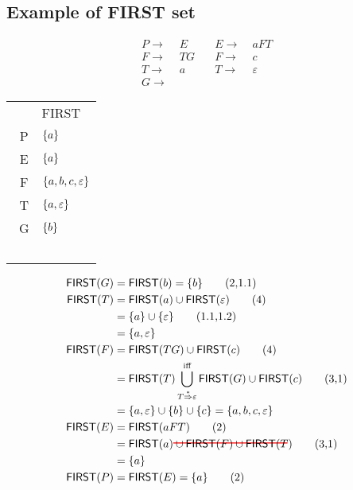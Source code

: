 \documentclass[10pt,a4paper,landscape]{article}
\begin{document}
\begin{multicols*}{3}
\section*{Example of FIRST set}
\begin{minipage}{.5\linewidth}
  \begin{align*}
    P \to &\; E \quad  &E \to &\; aFT  \\
    F \to &\; TG\quad  &F \to &\; c    \\
    T \to &\; a \quad  &T \to &\; \varepsilon  \\
    G \to &\
  \end{align*}
\end{minipage}
\begin{minipage}{.5\linewidth}
  \begin{tabular}{c|l}
    & \textsf{FIRST} \\
    \
    P &  $\{a\}$\\
    \
    E &  $\{a\}$\\
    \
    F &  $\{a,b,c,\varepsilon\}$\\
    \
    T & $\{a,\varepsilon\}$ \\
    \
    G & $\{b\}$ \\
    \
  \end{tabular}
\end{minipage}
\begin{align*}
  \mathsf{FIRST}(G) &= \mathsf{FIRST}(b) = \mset{b} \tag{2,1.1} \\
  \mathsf{FIRST}(T) &= \mathsf{FIRST}(a) \cup \mathsf{FIRST}(\varepsilon) \tag{4}\\
                    &= \mset{a} \cup \mset{\varepsilon} \tag{1.1,1.2} \\
                    &= \mset{a,\varepsilon} \\
  \mathsf{FIRST}(F) &= \mathsf{FIRST}(TG) \cup \mathsf{FIRST}(c) \tag{4} \\
                    &= \mathsf{FIRST}(T) \bigcup_{T\overset{*}{\Rightarrow}\varepsilon}^{\text{iff}} \mathsf{FIRST}(G) \cup \mathsf{FIRST}(c) \tag{3,1} \\
                    &= \mset{a,\varepsilon} \cup \mset{b} \cup \mset{c} = \mset{a,b,c,\varepsilon} \\
  \mathsf{FIRST}(E) &= \mathsf{FIRST}(aFT) \tag{2} \\
                    &= \mathsf{FIRST}(a) \hcancel{\cup \mathsf{FIRST}(F) \cup \mathsf{FIRST}(T)} \tag{3,1} \\
                    &= \mset{a} \\
  \mathsf{FIRST}(P) &= \mathsf{FIRST}(E) = \mset{a} \tag{2}
\end{align*}


\end{multicols*}
\end{document}
